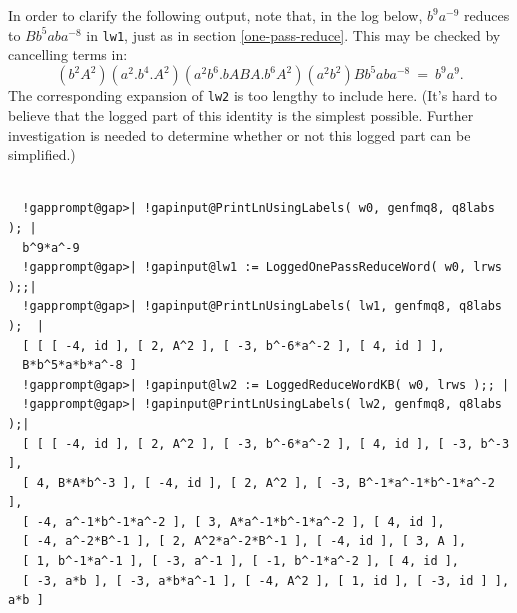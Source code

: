 \documentclass[a4paper,11pt]{report}
\begin{document}
{{{ In order to clarify the following output, note that, in the log below, $b^9a^{-9}$ reduces to $Bb^5aba^{-8}$ in \texttt{lw1}, just as in section \ref{one-pass-reduce}. This may be checked by cancelling terms in: 
\[ (b^2A^2)(a^2.b^4.A^2)(a^2b^6.bABA.b^6A^2)(a^2b^2)Bb^5aba^{-8} ~=~ b^9a^9. \]
 The corresponding expansion of \texttt{lw2} is too lengthy to include here. (It's hard to believe that the logged part of
this identity is the simplest possible. Further investigation is needed to
determine whether or not this logged part can be simplified.) 

 }

 
\begin{Verbatim}[commandchars=!@|,fontsize=\small,frame=single,label=Example]
  
  !gapprompt@gap>| !gapinput@PrintLnUsingLabels( w0, genfmq8, q8labs ); |
  b^9*a^-9
  !gapprompt@gap>| !gapinput@lw1 := LoggedOnePassReduceWord( w0, lrws );;|
  !gapprompt@gap>| !gapinput@PrintLnUsingLabels( lw1, genfmq8, q8labs );  |
  [ [ [ -4, id ], [ 2, A^2 ], [ -3, b^-6*a^-2 ], [ 4, id ] ], 
  B*b^5*a*b*a^-8 ]
  !gapprompt@gap>| !gapinput@lw2 := LoggedReduceWordKB( w0, lrws );; |
  !gapprompt@gap>| !gapinput@PrintLnUsingLabels( lw2, genfmq8, q8labs );|
  [ [ [ -4, id ], [ 2, A^2 ], [ -3, b^-6*a^-2 ], [ 4, id ], [ -3, b^-3 ], 
  [ 4, B*A*b^-3 ], [ -4, id ], [ 2, A^2 ], [ -3, B^-1*a^-1*b^-1*a^-2 ], 
  [ -4, a^-1*b^-1*a^-2 ], [ 3, A*a^-1*b^-1*a^-2 ], [ 4, id ], 
  [ -4, a^-2*B^-1 ], [ 2, A^2*a^-2*B^-1 ], [ -4, id ], [ 3, A ], 
  [ 1, b^-1*a^-1 ], [ -3, a^-1 ], [ -1, b^-1*a^-2 ], [ 4, id ], 
  [ -3, a*b ], [ -3, a*b*a^-1 ], [ -4, A^2 ], [ 1, id ], [ -3, id ] ], a*b ]
  
\end{Verbatim}
 }

 }

        
\end{document}
